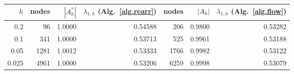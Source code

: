 \begin{tabular}{rrrrrrr}
\hline
$h$ & nodes & $|A^*_h|$ & $\lambda_{1,h}$ (Alg.~\ref{alg.rearr}) & nodes & $|A_h|$ & $\lambda_{1,h}$ (Alg.~\ref{alg.flow})\\
\hline
0.2 & 96 & 1.0000 & 0.54588 & 206 & 0.9800 & 0.53282\\
0.1 & 341 & 1.0000 & 0.53713 & 525 & 0.9961 & 0.53188\\
0.05 & 1281 & 1.0012 & 0.53333 & 1766 & 0.9982 & 0.53122\\
0.025 & 4961 & 1.0000 & 0.53206 & 6259 & 0.9998 & 0.53079\\
\hline
\end{tabular}
